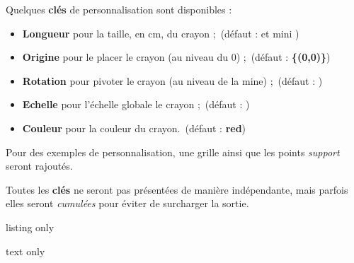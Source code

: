 \documentclass[french,a4paper,11pt]{article}
\newcommand\Cle[1]{{\bfseries\sffamily\textlangle #1\textrangle}}
\newcommand\affichegrille[4]{%
	\draw[xstep=1,ystep=1,lightgray] (#1,#3) grid (#2,#4) ;
	\foreach \x in {#1,\inteval{1+#1},...,#2} \draw[lightgray] (\x,#4)--++(0,3pt) node[font=\scriptsize,above] {$\x$} ;
	\foreach \y in {#3,\inteval{1+#3},...,#4} \draw[lightgray] (#1,\y)--++(-3pt,0) node[font=\scriptsize,left] {$\y$} ;
}
\newcommand\pointsutiles[1]{%
	\foreach \point in {#1} {\draw[thick,fill=red] \point circle[radius=3pt] ;}
}
\begin{document}
\begin{tipblock}
Quelques \Cle{clés} de personnalisation sont disponibles :

\begin{itemize}
	\item \Cle{Longueur} pour la taille, en cm, du crayon ;\hfill~(défaut : \Cle{5} et mini \Cle{2.5})
	\item \Cle{Origine} pour le placer le crayon (au niveau du $0$) ;\hfill~(défaut : \Cle{\{(0,0)\}})
	\item \Cle{Rotation} pour pivoter le crayon (au niveau de la mine) ;\hfill~(défaut : \Cle{0})
	\item \Cle{Echelle} pour l'échelle globale le crayon ;\hfill~(défaut : \Cle{1})
	\item \Cle{Couleur} pour la couleur du crayon.\hfill~(défaut : \Cle{red})
\end{itemize}
\vspace*{-\baselineskip}\leavevmode
\end{tipblock}

\begin{noteblock}
Pour des exemples de personnalisation, une grille ainsi que les points \textit{support} seront rajoutés.

\smallskip

Toutes les \Cle{clés} ne seront pas présentées de manière indépendante, mais parfois elles seront \textit{cumulées} pour éviter de surcharger la sortie.
\end{noteblock}

\begin{PresentationCode}{listing only}
\tkzCrayon[Origine={(-3,-2)},Echelle=0.75,Rotation=45,Couleur=DarkBlue]
\tkzCrayon[Origine={(1,-4)},Longueur=10,Rotation=-30,Couleur=Green]
\tkzCrayon[Origine={(-3,3)},Echelle=1.25,Rotation=195,Couleur=orange]
\end{PresentationCode}

\begin{PresentationCode}{text only}
\end{PresentationCode}

\pagebreak
\end{document}
